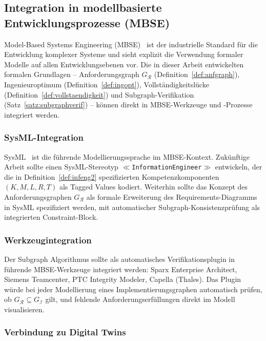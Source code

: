 ﻿\documentclass[a4paper,12pt]{article}
\theoremstyle{definition}
\begin{document}
\subsection{Integration in modellbasierte Entwicklungsprozesse (MBSE)}

Model-Based Systems Engineering (MBSE)~\cite{friedenthal2011} ist der industrielle
Standard für die Entwicklung komplexer Systeme und sieht explizit die Verwendung
formaler Modelle auf allen Entwicklungsebenen vor. Die in dieser Arbeit entwickelten
formalen Grundlagen -- Anforderungsgraph $G_\mathcal{R}$ (Definition~\ref{def:anfgraph}),
Ingenieuroptimum (Definition~\ref{def:ingopt}), Vollständigkeitslücke
(Definition~\ref{def:vollstaendigkeit}) und Subgraph-Verifikation
(Satz~\ref{satz:subgraphverif}) -- können direkt in MBSE-Werkzeuge und -Prozesse
integriert werden.

\subsubsection{SysML-Integration}

SysML~\cite{sysml2019} ist die führende Modellierungssprache im MBSE-Kontext.
Zukünftige Arbeit sollte einen SysML-Stereotyp \texttt{$\ll$InformationEngineer$\gg$}
entwickeln, der die in Definition~\ref{def:infeng2} spezifizierten Kompetenzkomponenten
$(K, M, L, R, T)$ als Tagged Values kodiert. Weiterhin sollte das Konzept des
Anforderungsgraphen $G_\mathcal{R}$ als formale Erweiterung des Requirements-Diagramms
in SysML spezifiziert werden, mit automatischer Subgraph-Konsistenzprüfung als
integrierten Constraint-Block.

\subsubsection{Werkzeugintegration}

Der Subgraph Algorithmus sollte als automatisches Verifikationsplugin in führende
MBSE-Werkzeuge integriert werden: Sparx Enterprise Architect, Siemens Teamcenter,
PTC Integrity Modeler, Capella (Thales). Das Plugin würde bei jeder Modellierung
eines Implementierungsgraphen automatisch prüfen, ob $G_\mathcal{R} \subseteq G_\mathcal{I}$
gilt, und fehlende Anforderungserfüllungen direkt im Modell visualisieren.

\subsubsection{Verbindung zu Digital Twins}
\end{document}
